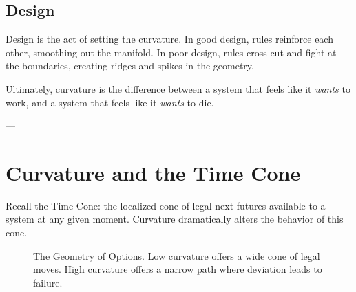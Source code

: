 \subsection{\textbf{Design}}
Design is the act of setting the curvature. In good design, rules reinforce each other, smoothing out the manifold. In poor design, rules cross-cut and fight at the boundaries, creating ridges and spikes in the geometry.

Ultimately, curvature is the difference between a system that feels like it \textit{wants} to work, and a system that feels like it \textit{wants} to die.

---

\section{\texorpdfstring{\textbf{Curvature and the Time Cone}}{9.5 --- Curvature and the Time Cone}}

Recall the Time Cone: the localized cone of legal next futures available to a system at any given moment. Curvature dramatically alters the behavior of this cone.

\begin{figure}[h]
\centering
{}
\caption{The Geometry of Options. Low curvature offers a wide cone of legal moves. High curvature offers a narrow path where deviation leads to failure.}
\end{figure}

